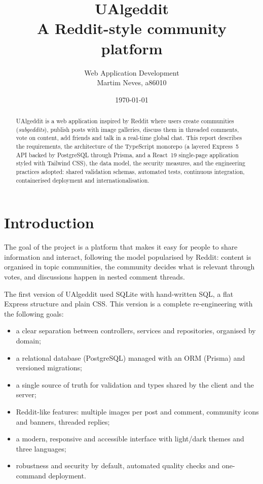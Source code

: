 \documentclass[11pt,a4paper]{article}
\title{\textbf{UAlgeddit}\\[4pt]\large A Reddit-style community platform}
\author{Web Application Development\\Martim Neves, a86010}
\date{\today}
\begin{document}
\maketitle

\begin{abstract}
UAlgeddit is a web application inspired by Reddit where users create communities (\emph{subgeddits}), publish
posts with image galleries, discuss them in threaded comments, vote on content, add friends and talk in a real-time
global chat. This report describes the requirements, the architecture of the TypeScript monorepo (a layered
Express~5 API backed by PostgreSQL through Prisma, and a React~19 single-page application styled with Tailwind CSS),
the data model, the security measures, and the engineering practices adopted: shared validation schemas, automated
tests, continuous integration, containerised deployment and internationalisation.
\end{abstract}

\tableofcontents
\newpage

\section{Introduction}

The goal of the project is a platform that makes it easy for people to share information and interact, following
the model popularised by Reddit: content is organised in topic communities, the community decides what is relevant
through votes, and discussions happen in nested comment threads.

The first version of UAlgeddit used SQLite with hand-written SQL, a flat Express structure and plain CSS. This
version is a complete re-engineering with the following goals:

\begin{itemize}
  \item a clear separation between controllers, services and repositories, organised by domain;
  \item a relational database (PostgreSQL) managed with an ORM (Prisma) and versioned migrations;
  \item a single source of truth for validation and types shared by the client and the server;
  \item Reddit-like features: multiple images per post and comment, community icons and banners, threaded replies;
  \item a modern, responsive and accessible interface with light/dark themes and three languages;
  \item robustness and security by default, automated quality checks and one-command deployment.
\end{itemize}
\end{document}
